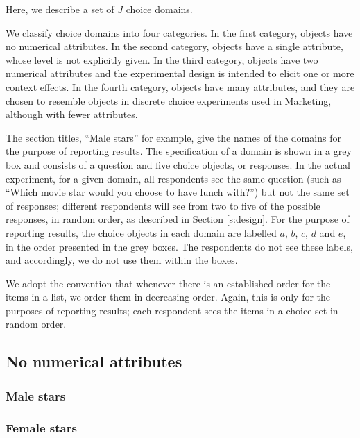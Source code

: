 \documentclass[11pt,letter]{article}
\begin{document}
Here, we describe a set of $J$ choice domains.

We classify choice domains into four categories.
In the first category, objects have no numerical attributes.
In the second category, objects have a single attribute, whose level is not explicitly given. In the third category, objects have two numerical attributes and the experimental design is intended to elicit one or more context effects.
In the fourth category, objects have many attributes, and they are chosen to resemble objects in discrete choice experiments used in Marketing, although with fewer attributes.

The section titles, ``Male stars'' for example, give the names of the domains for the purpose of reporting results.
The specification of a domain is shown in a grey box and consists of a question and five choice objects, or responses.
In the actual experiment, for a given domain, all respondents see the same question (such as ``Which movie star would you choose to have lunch with?'') but not the same set of responses; different respondents will see from two to five of the possible responses, in random order, as described in Section \ref{s:design}.
For the purpose of reporting results, the choice objects in each domain are labelled $a$, $b$, $c$, $d$ and $e$, in the order presented in the grey boxes.
The respondents do not see these labels, and accordingly, we do not use them within the boxes.

We adopt the convention that whenever there is an established order for the items in a list, we order them in decreasing order.
Again, this is only for the purposes of reporting results; each respondent sees the items in a choice set in random order.

\subsection{No numerical attributes}

\subsubsection{Male stars}



\subsubsection{Female stars}


\end{document}
